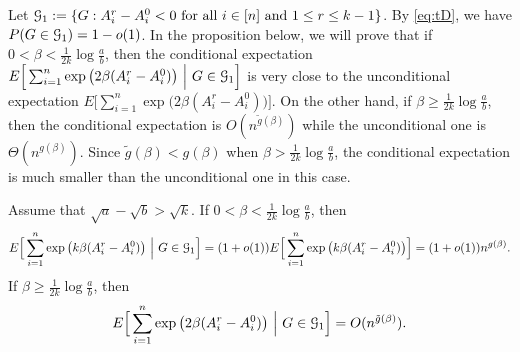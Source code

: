 \documentclass{article}
\begin{document}
Let $\mathcal{G}_1:=\{G:A^r_i-A^0_i<0\text{~for all~}i\in[n]\text{~and~} 1\leq r \leq k-1\}$. By \eqref{eq:tD}, we have $P(G\in\mathcal{G}_1)=1-o(1)$. In the proposition below, we will prove that if $0<\beta<\frac{1}{2k}\log\frac{a}{b}$,
then the conditional expectation $E \Big[ \sum_{i=1}^n  \exp\big(2\beta (A^r_i-A^0_i) \big) ~\Big|~ G\in\mathcal{G}_1 \Big]$ is very close to the unconditional expectation $E \Big[ \sum_{i=1}^n  \exp\big(2\beta (A^r_i-A^0_i) \big) \Big]$. On the other hand, if $\beta\ge\frac{1}{2k}\log\frac{a}{b}$, then the conditional expectation is $O(n^{\tilde{g}(\beta)})$ while the unconditional one is $\Theta(n^{g(\beta)})$. Since $\tilde{g}(\beta)<g(\beta)$ when $\beta>\frac{1}{2k}\log\frac{a}{b}$, the conditional expectation is much smaller than the unconditional one in this case.
\begin{proposition}  \label{prop:df}
Assume that $\sqrt{a}-\sqrt{b}>\sqrt{k}$.
If $0<\beta<\frac{1}{2k}\log\frac{a}{b}$, then
$$
E \Big[ \sum_{i=1}^n  \exp\big(k\beta (A^r_i-A^0_i) \big) ~\Big|~ G\in\mathcal{G}_1 \Big] 
= (1+o(1)) E \Big[ \sum_{i=1}^n  \exp\big(k\beta (A^r_i-A^0_i) \big) \Big]
= (1+o(1)) n^{g(\beta)}  .
$$
If $\beta\ge\frac{1}{2k}\log\frac{a}{b}$, then
\begin{align*}
E \Big[ \sum_{i=1}^n  \exp\big(2\beta (A^r_i-A^0_i) \big) ~\Big|~ G\in\mathcal{G}_1 \Big] 
= O(n^{\tilde{g}(\beta)})  .
\end{align*}
\end{proposition}
\end{document}
